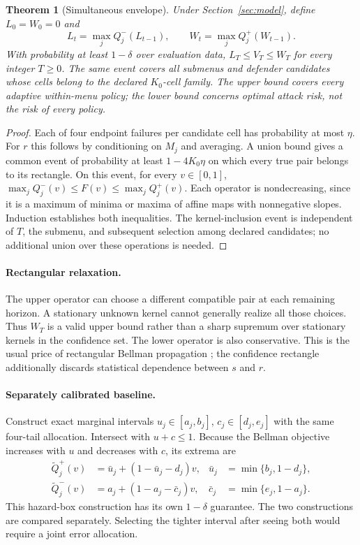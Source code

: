 \documentclass[10pt]{article}
\newtheorem{theorem}{Theorem}
\begin{document}
\begin{theorem}[Simultaneous envelope]\label{thm:coverage}
Under Section~\ref{sec:model}, define $L_0=W_0=0$ and
\begin{equation}L_t=\max_jQ_j^-(L_{t-1}),\qquad W_t=\max_jQ_j^+(W_{t-1}).\label{eq:env}\end{equation}
With probability at least $1-\delta$ over evaluation data, $L_T\leq V_T\leq W_T$ for every integer $T\geq0$. The same event covers all submenus and defender candidates whose cells belong to the declared $K_0$-cell family. The upper bound covers every adaptive within-menu policy; the lower bound concerns optimal attack risk, not the risk of every policy.
\end{theorem}
\begin{proof}
Each of four endpoint failures per candidate cell has probability at most $\eta$. For $r$ this follows by conditioning on $M_j$ and averaging. A union bound gives a common event of probability at least $1-4K_0\eta$ on which every true pair belongs to its rectangle. On this event, for every $v\in[0,1]$, $\max_jQ_j^-(v)\leq F(v)\leq\max_jQ_j^+(v)$. Each operator is nondecreasing, since it is a maximum of minima or maxima of affine maps with nonnegative slopes. Induction establishes both inequalities. The kernel-inclusion event is independent of $T$, the submenu, and subsequent selection among declared candidates; no additional union over these operations is needed.
\end{proof}

\paragraph{Rectangular relaxation.}
The upper operator can choose a different compatible pair at each remaining horizon. A stationary unknown kernel cannot generally realize all those choices. Thus $W_T$ is a valid upper bound rather than a sharp supremum over stationary kernels in the confidence set. The lower operator is also conservative. This is the usual price of rectangular Bellman propagation \citep{iyengar,nilim}; the confidence rectangle additionally discards statistical dependence between $s$ and $r$.

\paragraph{Separately calibrated baseline.}
Construct exact marginal intervals $u_j\in[a_j,b_j]$, $c_j\in[d_j,e_j]$ with the same four-tail allocation. Intersect with $u+c\leq1$. Because the Bellman objective increases with $u$ and decreases with $c$, its extrema are
\begin{align}
\widetilde Q_j^+(v)&=\bar u_j+(1-\bar u_j-d_j)v,&\bar u_j&=\min\{b_j,1-d_j\},\\
\widetilde Q_j^-(v)&=a_j+(1-a_j-\bar c_j)v,&\bar c_j&=\min\{e_j,1-a_j\}.
\end{align}
This hazard-box construction has its own $1-\delta$ guarantee. The two constructions are compared separately. Selecting the tighter interval after seeing both would require a joint error allocation.
\end{document}
